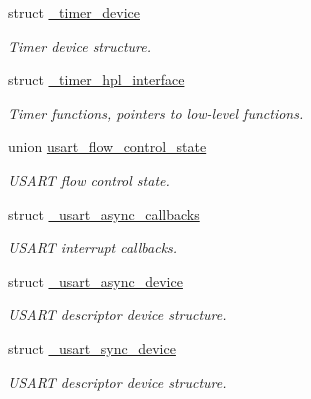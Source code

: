 \begin{DoxyCompactItemize}
struct \hyperlink{struct__timer__device}{\+\_\+timer\+\_\+device}
\begin{DoxyCompactList}\small\item\em Timer device structure. \end{DoxyCompactList}\item 
struct \hyperlink{struct__timer__hpl__interface}{\+\_\+timer\+\_\+hpl\+\_\+interface}
\begin{DoxyCompactList}\small\item\em Timer functions, pointers to low-\/level functions. \end{DoxyCompactList}\item 
union \hyperlink{unionusart__flow__control__state}{usart\+\_\+flow\+\_\+control\+\_\+state}
\begin{DoxyCompactList}\small\item\em U\+S\+A\+RT flow control state. \end{DoxyCompactList}\item 
struct \hyperlink{struct__usart__async__callbacks}{\+\_\+usart\+\_\+async\+\_\+callbacks}
\begin{DoxyCompactList}\small\item\em U\+S\+A\+RT interrupt callbacks. \end{DoxyCompactList}\item 
struct \hyperlink{struct__usart__async__device}{\+\_\+usart\+\_\+async\+\_\+device}
\begin{DoxyCompactList}\small\item\em U\+S\+A\+RT descriptor device structure. \end{DoxyCompactList}\item 
struct \hyperlink{struct__usart__sync__device}{\+\_\+usart\+\_\+sync\+\_\+device}
\begin{DoxyCompactList}\small\item\em U\+S\+A\+RT descriptor device structure. \end{DoxyCompactList}\end{DoxyCompactItemize}
